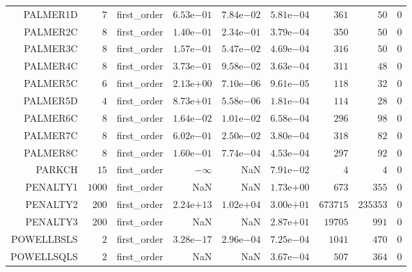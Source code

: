 \begin{longtable}{rrrrrrrrr}
PALMER1D & \(     7\) & first\_order & \( 6.53\)e\(-01\) & \( 7.84\)e\(-02\) & \( 5.81\)e\(-04\) & \(   361\) & \(    50\) & \(     0\) \\
PALMER2C & \(     8\) & first\_order & \( 1.40\)e\(-01\) & \( 2.34\)e\(-01\) & \( 3.79\)e\(-04\) & \(   350\) & \(    50\) & \(     0\) \\
PALMER3C & \(     8\) & first\_order & \( 1.57\)e\(-01\) & \( 5.47\)e\(-02\) & \( 4.69\)e\(-04\) & \(   316\) & \(    50\) & \(     0\) \\
PALMER4C & \(     8\) & first\_order & \( 3.73\)e\(-01\) & \( 9.58\)e\(-02\) & \( 3.63\)e\(-04\) & \(   311\) & \(    48\) & \(     0\) \\
PALMER5C & \(     6\) & first\_order & \( 2.13\)e\(+00\) & \( 7.10\)e\(-06\) & \( 9.61\)e\(-05\) & \(   118\) & \(    32\) & \(     0\) \\
PALMER5D & \(     4\) & first\_order & \( 8.73\)e\(+01\) & \( 5.58\)e\(-06\) & \( 1.81\)e\(-04\) & \(   114\) & \(    28\) & \(     0\) \\
PALMER6C & \(     8\) & first\_order & \( 1.64\)e\(-02\) & \( 1.01\)e\(-02\) & \( 6.58\)e\(-04\) & \(   296\) & \(    98\) & \(     0\) \\
PALMER7C & \(     8\) & first\_order & \( 6.02\)e\(-01\) & \( 2.50\)e\(-02\) & \( 3.80\)e\(-04\) & \(   318\) & \(    82\) & \(     0\) \\
PALMER8C & \(     8\) & first\_order & \( 1.60\)e\(-01\) & \( 7.74\)e\(-04\) & \( 4.53\)e\(-04\) & \(   297\) & \(    92\) & \(     0\) \\
PARKCH & \(    15\) & first\_order & \(-\infty\) &       NaN & \( 7.91\)e\(-02\) & \(     4\) & \(     4\) & \(     0\) \\
PENALTY1 & \(  1000\) & first\_order &       NaN &       NaN & \( 1.73\)e\(+00\) & \(   673\) & \(   355\) & \(     0\) \\
PENALTY2 & \(   200\) & first\_order & \( 2.24\)e\(+13\) & \( 1.02\)e\(+04\) & \( 3.00\)e\(+01\) & \(673715\) & \(235353\) & \(     0\) \\
PENALTY3 & \(   200\) & first\_order &       NaN &       NaN & \( 2.87\)e\(+01\) & \( 19705\) & \(   991\) & \(     0\) \\
POWELLBSLS & \(     2\) & first\_order & \( 3.28\)e\(-17\) & \( 2.96\)e\(-04\) & \( 7.25\)e\(-04\) & \(  1041\) & \(   470\) & \(     0\) \\
POWELLSQLS & \(     2\) & first\_order &       NaN &       NaN & \( 3.67\)e\(-04\) & \(   507\) & \(   364\) & \(     0\) \\

\end{longtable}
